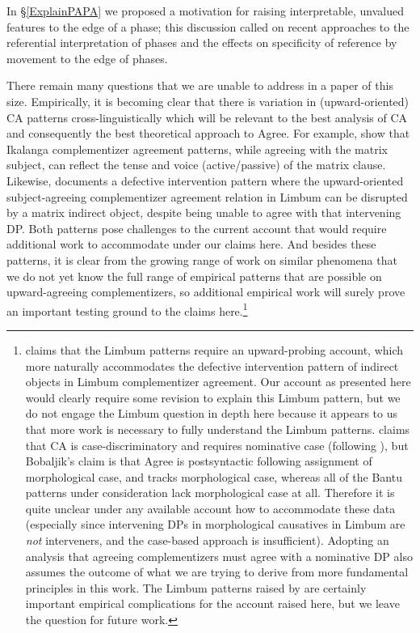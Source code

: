 \documentclass[output=paper
,modfonts
,nonflat
]{langsci/langscibook}
\begin{document}
In \S \ref{ExplainPAPA} we proposed a motivation for raising interpretable, unvalued features to the edge of a phase; this discussion called on recent approaches to the referential interpretation of phases and the effects on specificity of reference by movement to the edge of phases. 
        
There remain many questions that we are unable to address in a paper of this size. Empirically, it is becoming clear that there is variation in (upward-oriented) CA patterns cross-linguistically which will be relevant to the best analysis of CA and consequently the best theoretical approach to Agree. For example, \citet{LetsholoSafir:2017} show that Ikalanga complementizer agreement patterns, while agreeing with the matrix subject, can reflect the tense and voice (active/passive) of the matrix clause. Likewise, \citet{Nformi:2017} documents a defective intervention pattern where the upward-oriented subject-agreeing complementizer agreement relation in Limbum can be disrupted by a matrix indirect object, despite being unable to agree with that intervening DP. Both patterns pose challenges to the current account that would require additional work to accommodate under our claims here. And besides these patterns, it is clear from the growing range of work on similar phenomena that we do not yet know the full range of empirical patterns that are possible on upward-agreeing complementizers, so additional empirical work will surely prove an important testing ground to the claims here.\footnote{\citet{Nformi:2017} claims that the Limbum patterns require an upward-probing account, which more naturally accommodates the defective intervention pattern of indirect objects in Limbum complementizer agreement. Our account as presented here would clearly require some revision to explain this Limbum pattern, but we do not engage the Limbum question in depth here because it appears to us that more work is necessary to fully understand the Limbum patterns. \citet{Nformi:2017} claims that CA is case-discriminatory and requires nominative case (following \citealt{Bobaljik:2008}), but Bobaljik's claim is that Agree is postsyntactic following assignment of morphological case, and tracks morphological case, whereas all of the Bantu patterns under consideration lack morphological case at all. Therefore it is quite unclear under any available account how to accommodate these data (especially since intervening DPs in morphological causatives in Limbum are \textit{not} interveners, and the case-based approach is insufficient). Adopting an analysis that agreeing complementizers must agree with a nominative DP also assumes the outcome of what we are trying to derive from more fundamental principles in this work. The Limbum patterns raised by \citet{Nformi:2017} are certainly important empirical complications for the account raised here, but we leave the question for future work.} 
\end{document}
